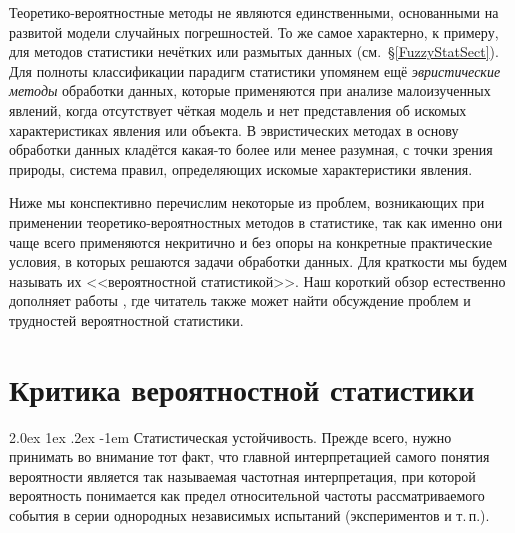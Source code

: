 \documentclass[a5paper,openany]{book}
\makeatletter
\renewcommand\paragraph{\@startsection{paragraph}{4}{\z@}%
                         {2.0ex \@plus1ex \@minus.2ex}%
                         {-1em}%
                         {\normalfont\normalsize\bfseries}}
\makeatother
\begin{document}
Теоретико-вероятностные методы не являются единственными, основанными на развитой 
модели случайных погрешностей. То же самое характерно, к примеру, для методов 
статистики нечётких или размытых данных (см.~\S\ref{FuzzyStatSect}). Для полноты 
классификации парадигм статистики упомянем ещё \emph{эвристические методы} обработки 
данных, которые применяются при анализе малоизученных 
явлений, когда отсутствует чёткая модель и нет представления об искомых характеристиках 
явления или объекта. В эвристических методах в основу обработки данных кладётся 
какая-то более или менее разумная, с точки зрения природы, система правил, определяющих 
искомые характеристики явления. 
  
Ниже мы конспективно перечислим некоторые из проблем, возникающих при применении  
теоретико-вероятностных методов в статистике, так как именно они чаще всего применяются
некритично и без опоры на конкретные практические условия, в которых решаются задачи
обработки данных. Для краткости мы будем называть их <<вероятностной статистикой>>. 
Наш короткий обзор естественно дополняет работы \cite{Alimov1980, AlimovKravtsov, 
VoschiBochkovSotirov, Voschinin2002, VoschininIMRO, Chaikovskii, Tutubalin1977, 
Tutubalin1993}, где читатель также может найти обсуждение проблем и трудностей 
вероятностной статистики.     
   
  
\section{Критика вероятностной статистики} 
   
   
\paragraph{Статистическая устойчивость.} 
Прежде всего, нужно принимать во внимание тот факт, что главной интерпретацией  
самого понятия вероятности является так называемая частотная интерпретация, при 
которой вероятность понимается как предел относительной частоты рассматриваемого 
события в серии однородных независимых испытаний (экспериментов и т.\,п.). 
   
\end{document}
